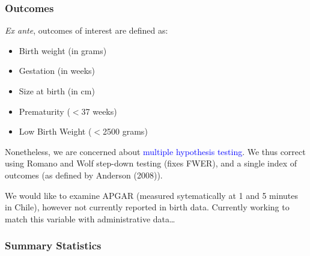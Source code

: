 \documentclass[10pt,letterpaper,subeqn]{beamer}
\begin{document}
\begin{frame}
  \frametitle{Outcomes}
  \emph{Ex ante}, outcomes of interest are defined as:
  \begin{itemize}
  \item Birth weight (in grams)
  \item Gestation (in weeks)
  \item Size at birth (in cm)
  \item Prematurity ($<$37 weeks)
  \item Low Birth Weight ($<$2500 grams)
  \end{itemize}
  \vspace{4mm}
  Nonetheless, we are concerned about \textcolor{blue}{multiple hypothesis testing}.  We thus correct using Romano and Wolf step-down testing (fixes FWER), and a single index of outcomes (as defined by Anderson (2008)).
  \\ \vspace{4mm}
  
  We would like to examine APGAR (measured sytematically at 1 and 5 minutes in Chile), however not currently reported in birth data.  Currently working to match this variable with administrative data\ldots
\end{frame}

\begin{frame}
\frametitle{Summary Statistics}

\begin{table}[htpb!]
  \begin{center}
    \caption{Summary Statistics: Birth and Chile Crece Contigo Data}
    \label{tab:sumstats}
  \end{center}
\end{table}
\end{frame}
%
\end{document}
